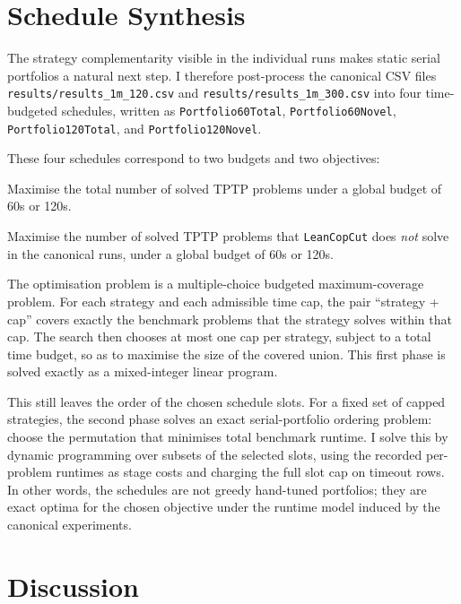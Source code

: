 \documentclass[11pt,twocolumn]{article}
\begin{document}
\section{Schedule Synthesis}

The strategy complementarity visible in the individual runs makes static serial portfolios a natural next step. I therefore post-process the canonical CSV files \texttt{results/results\_1m\_120.csv} and \texttt{results/results\_1m\_300.csv} into four time-budgeted schedules, written as \texttt{Portfolio60Total}, \texttt{Portfolio60Novel}, \texttt{Portfolio120Total}, and \texttt{Portfolio120Novel}.

These four schedules correspond to two budgets and two objectives:

\begin{description}[style=nextline, itemsep=-3pt, leftmargin=18pt]
	\item[Portfolio60Total / Portfolio120Total] Maximise the total number of solved TPTP problems under a global budget of 60s or 120s.
\item[Portfolio60Novel / Portfolio120Novel] Maximise the number of solved TPTP problems that \texttt{LeanCopCut} does \emph{not} solve in the canonical runs, under a global budget of 60s or 120s.
\end{description}

The optimisation problem is a multiple-choice budgeted maximum-coverage problem. For each strategy and each admissible time cap, the pair ``strategy + cap'' covers exactly the benchmark problems that the strategy solves within that cap. The search then chooses at most one cap per strategy, subject to a total time budget, so as to maximise the size of the covered union. This first phase is solved exactly as a mixed-integer linear program.

This still leaves the order of the chosen schedule slots. For a fixed set of capped strategies, the second phase solves an exact serial-portfolio ordering problem: choose the permutation that minimises total benchmark runtime. I solve this by dynamic programming over subsets of the selected slots, using the recorded per-problem runtimes as stage costs and charging the full slot cap on timeout rows. In other words, the schedules are not greedy hand-tuned portfolios; they are exact optima for the chosen objective under the runtime model induced by the canonical experiments.

\section{Discussion}
\end{document}
